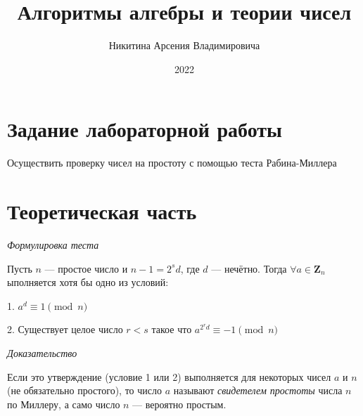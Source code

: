 \documentclass[bachelor, och, labwork]{shiza}
\begin{document}
\title{Алгоритмы алгебры и теории чисел}





\author{Никитина Арсения Владимировича}




\date{2022}

\maketitle



\tableofcontents

\section{Задание лабораторной работы}

Осуществить проверку чисел на простоту с помощью теста Рабина-Миллера

\section{Теоретическая часть}

\begin{center}
    \textit{Формулировка теста}
\end{center}

Пусть $n$ --- простое число и $n-1=2^{s}d$, где $d$ --- нечётно. Тогда 
$\forall a \in \mathbf{Z} _n$ ыполняется хотя бы одно из условий:

\begin{center}
    1. $a^{d}\equiv 1{\pmod {n}}$

    2. Существует целое число $r < s$ такое что $a^{2^{r}d}\equiv -1{\pmod {n}}$
\end{center}

\begin{center}
    \textit{Доказательство}
\end{center}

Если это утверждение (условие 1 или 2) выполняется для некоторых чисел 
$a$ и $n$ (не обязательно простого), то число $a$ называют \textit{свидетелем простоты} 
числа $n$ по Миллеру, а само число $n$ --- вероятно простым.
\end{document}
